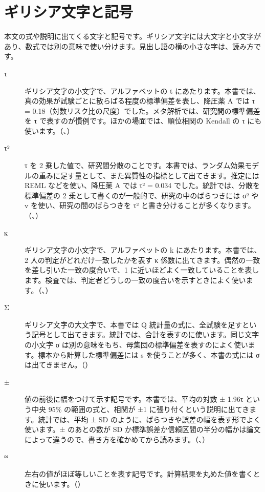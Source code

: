 \section{ギリシア文字と記号}
\label{sec:B-3}

本文の式や説明に出てくる文字と記号です。ギリシア文字には大文字と小文字があり、数式では別の意味で使い分けます。見出し語の横の小さな字は、読み方です。

\begin{description}
\item[τ] ギリシア文字の小文字で、アルファベットの t にあたります。本書では、真の効果が試験ごとに散らばる程度の標準偏差を表し、降圧薬 A では τ = 0.18（対数リスク比の尺度）でした。メタ解析では、研究間の標準偏差を τ で表すのが慣例です。ほかの場面では、順位相関の Kendall の τ にも使います。（、）
\item[τ²] τ を 2 乗した値で、研究間分散のことです。本書では、ランダム効果モデルの重みに足す量として、また異質性の指標として出てきます。推定には REML などを使い、降圧薬 A では τ² = 0.034 でした。統計では、分散を標準偏差の 2 乗として書くのが一般的で、研究の中のばらつきには σ² や v を使い、研究の間のばらつきを τ² と書き分けることが多くなります。（、）
\item[κ] ギリシア文字の小文字で、アルファベットの k にあたります。本書では、2 人の判定がどれだけ一致したかを表す κ 係数に出てきます。偶然の一致を差し引いた一致の度合いで、1 に近いほどよく一致していることを表します。検査では、判定者どうしの一致の度合いを示すときによく使います。（、）
\item[Σ] ギリシア文字の大文字で、本書では Q 統計量の式に、全試験を足すという記号として出てきます。統計では、合計を表すのに使います。同じ文字の小文字 σ は別の意味をもち、母集団の標準偏差を表すのによく使います。標本から計算した標準偏差には s を使うことが多く、本書の式には σ は出てきません。（）
\item[±] 値の前後に幅をつけて示す記号です。本書では、平均の対数 ± 1.96τ という中央 95\% の範囲の式と、相関が ±1 に張り付くという説明に出てきます。統計では、平均 ± SD のように、ばらつきや誤差の幅を表す形でよく使います。± のあとの数が SD か標準誤差か信頼区間の半分の幅かは論文によって違うので、書き方を確かめてから読みます。（、）
\item[≈] 左右の値がほぼ等しいことを表す記号です。計算結果を丸めた値を書くときに使います。（）

\end{description}
